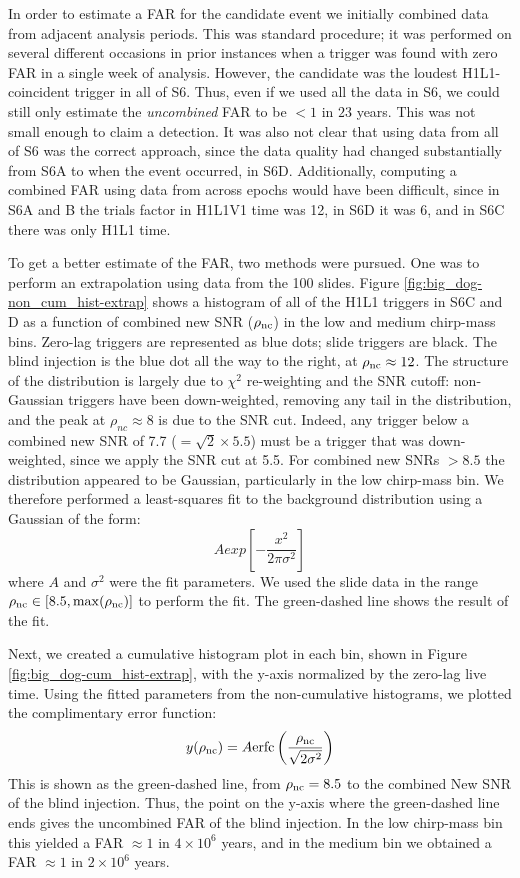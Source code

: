 In order to estimate a \ac{FAR} for the candidate event we initially combined
data from adjacent analysis periods. This was standard procedure; it was performed
on several different occasions in prior instances when a trigger was found with
zero \ac{FAR} in a single week of analysis. However, the candidate was the loudest
H1L1-coincident trigger in all of S6. Thus, even if we used all the data in S6, we could
still only estimate the \emph{uncombined} \ac{FAR} to be $< 1$ in $23$ years.
This was not small enough to claim a detection. It was also not clear that
using data from all of S6 was the correct approach, since the data quality had
changed substantially from S6A to when the event occurred, in S6D.
Additionally, computing a combined \ac{FAR} using data from across epochs would
have been difficult, since in S6A and B the trials factor in H1L1V1 time was
12, in S6D it was 6, and in S6C there was only H1L1 time. 

To get a better estimate of the \ac{FAR}, two methods were pursued. One was to
perform an extrapolation using data from the 100 slides. Figure
\ref{fig:big_dog-non_cum_hist-extrap} shows a histogram of all of the H1L1
triggers in S6C and D as a function of combined new \ac{SNR} ($\rho_{\mathrm{nc}}$) in
the low and medium chirp-mass bins. Zero-lag triggers are represented as blue
dots; slide triggers are black. The blind injection is the blue dot all the way
to the right, at $\rho_{\mathrm{nc}} \approx 12$. The structure of the distribution is
largely due to $\chi^2$ re-weighting and the \ac{SNR} cutoff: non-Gaussian
triggers have been down-weighted, removing any tail in the distribution, and
the peak at $\rho_{nc} \approx 8$ is due to the \ac{SNR} cut. Indeed, any
trigger below a combined new \ac{SNR} of 7.7 ($= \sqrt{2}\times 5.5$) must be a
trigger that was down-weighted, since we apply the \ac{SNR} cut at 5.5. For
combined new \acp{SNR} $> 8.5$ the distribution appeared to be Gaussian,
particularly in the low chirp-mass bin. We therefore performed a least-squares
fit to the background distribution using a Gaussian of the form:
\begin{equation*}
A exp\left[ -\frac{x^2}{2\pi\sigma^2} \right]
\end{equation*}
where $A$ and $\sigma^2$ were the fit parameters. We used the slide data in the
range $\rho_{\mathrm{nc}} \in [8.5, \max(\rho_{\mathrm{nc}})]$ to perform the fit. The green-dashed
line shows the result of the fit.

Next, we created a cumulative histogram plot in each bin, shown in Figure
\ref{fig:big_dog-cum_hist-extrap}, with the y-axis normalized by the zero-lag
live time. Using the fitted parameters from the non-cumulative histograms, we
plotted the complimentary error function:
\begin{equation*}
y(\rho_{\mathrm{nc}}) = A\mathrm{erfc}\left(\frac{\rho_{\mathrm{nc}}}{\sqrt{2\sigma^2}}\right)
\end{equation*}
This is shown as the green-dashed line, from $\rho_{\mathrm{nc}} = 8.5$ to the combined
New \ac{SNR} of the blind injection. Thus, the point on the y-axis where the
green-dashed line ends gives the uncombined \ac{FAR} of the blind injection. In
the low chirp-mass bin this yielded a \ac{FAR} $\approx 1$ in $4\times 10^{6}$
years, and in the medium bin we obtained a \ac{FAR} $\approx 1$ in $2\times
10^{6}$ years.

